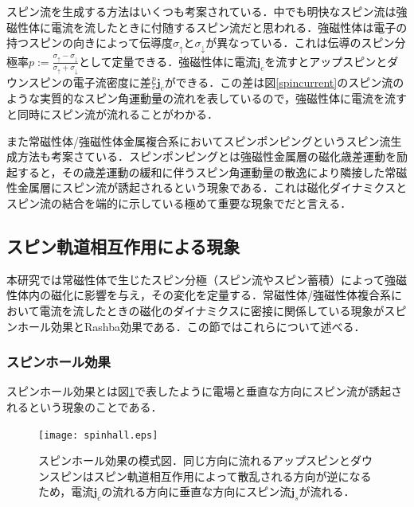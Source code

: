 スピン流を生成する方法はいくつも考案されている．中でも明快なスピン流は強磁性体に電流を流したときに付随するスピン流だと思われる．強磁性体は電子の持つスピンの向きによって伝導度$\sigma_{\uparrow}$と$\sigma_{\downarrow}$が異なっている．これは伝導のスピン分極率$p:=\frac{\sigma_{\uparrow}-\sigma_{\downarrow}}{\sigma_{\uparrow}+\sigma_{\downarrow}}$として定量できる．強磁性体に電流$\bm{j}_{c}$を流すとアップスピンとダウンスピンの電子流密度に差$\frac{p}{e}\bm{j}_{c}$ができる．この差は図\ref{spincurrent}のスピン流のような実質的なスピン角運動量の流れを表しているので，強磁性体に電流を流すと同時にスピン流が流れることがわかる．

また常磁性体/強磁性体金属複合系においてスピンポンピングというスピン流生成方法\cite{mizukami2002effect,tserkovnyak2002enhanced}も考案さている．スピンポンピングとは強磁性金属層の磁化歳差運動を励起すると，その歳差運動の緩和に伴うスピン角運動量の散逸により隣接した常磁性金属層にスピン流が誘起されるという現象である．これは磁化ダイナミクスとスピン流の結合を端的に示している極めて重要な現象でだと言える．\\


\subsection{スピン軌道相互作用による現象}
本研究では常磁性体で生じたスピン分極（スピン流やスピン蓄積）によって強磁性体内の磁化に影響を与え，その変化を定量する．常磁性体/強磁性体複合系において電流を流したときの磁化のダイナミクスに密接に関係している現象がスピンホール効果とRashba効果である．この節ではこれらについて述べる．\\
\subsubsection{スピンホール効果}


スピンホール効果とは図\ref{spinhall}で表したように電場と垂直な方向にスピン流が誘起されるという現象のことである．

\begin{figure}[htbp]
 \begin{center}
  \texttt{[image: spinhall.eps]}
 \end{center}
 \caption{スピンホール効果の模式図．同じ方向に流れるアップスピンとダウンスピンはスピン軌道相互作用によって散乱される方向が逆になるため，電流$\bm{j}_{c}$の流れる方向に垂直な方向にスピン流$\bm{j}_{s}$が流れる．}
 \label{spinhall}
\end{figure}

